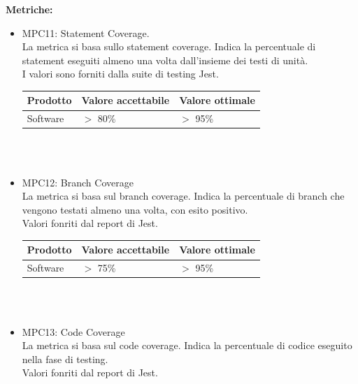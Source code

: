 \documentclass[12pt]{article}
\begin{document}
\textbf{Metriche:}
\begin{itemize}
	\item MPC11: Statement Coverage. \\
	      La metrica si basa sullo statement coverage.
	      Indica la percentuale di statement eseguiti almeno una volta dall'insieme dei testi di unità.\\
	      I valori sono forniti dalla suite di testing Jest.

	      \begin{center}
		      \begin{tabularx}{\textwidth}{|X|X|X|}
			      \hline
			      \textbf{Prodotto} & \textbf{Valore accettabile } & \textbf{Valore ottimale } \\
			      \hline
			      Software          & $>$ 80\%                     & $>$ 95\%                  \\
			      \hline
		      \end{tabularx}\\[8pt]
		      \mbox{}\\
	      \end{center}

	\item MPC12: Branch Coverage \\
	      La metrica si basa sul branch coverage. Indica la percentuale di branch che vengono testati almeno una volta, con esito positivo. \\
	      Valori fonriti dal report di Jest.

	      \begin{center}
		      \begin{tabularx}{\textwidth}{|X|X|X|}
			      \hline
			      \textbf{Prodotto} & \textbf{Valore accettabile } & \textbf{Valore ottimale } \\
			      \hline
			      Software          & $>$ 75\%                     & $>$ 95\%                  \\
			      \hline
		      \end{tabularx}\\[8pt]
		      \mbox{}\\
	      \end{center}

	\item MPC13: Code Coverage \\
	      La metrica si basa sul code coverage. Indica la percentuale di codice eseguito nella fase di testing. \\
	      Valori fonriti dal report di Jest.


\end{itemize}
\end{document}
